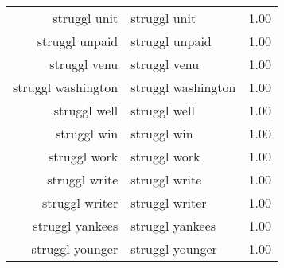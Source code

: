 \begin{table}[ht]
\begin{tabular}{rlr}
  struggl unit & struggl unit & 1.00 \\ 
  struggl unpaid & struggl unpaid & 1.00 \\ 
  struggl venu & struggl venu & 1.00 \\ 
  struggl washington & struggl washington & 1.00 \\ 
  struggl well & struggl well & 1.00 \\ 
  struggl win & struggl win & 1.00 \\ 
  struggl work & struggl work & 1.00 \\ 
  struggl write & struggl write & 1.00 \\ 
  struggl writer & struggl writer & 1.00 \\ 
  struggl yankees & struggl yankees & 1.00 \\ 
  struggl younger & struggl younger & 1.00 \\ 
   \hline
\end{tabular}
\end{table}
